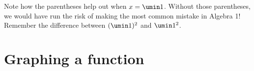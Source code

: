Note how the parentheses help out when $x = \umin1$. Without those parentheses, we would have run the risk of making the most common mistake in Algebra 1! Remember the difference between $(\umin1)^2$ and $\umin1^2$.


%
%
%


\section{Graphing a function}
\label{sec:graphingfunc}

